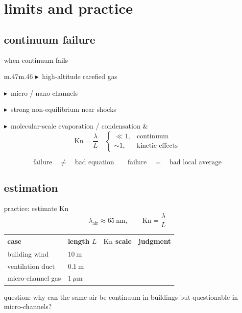 \documentclass[UTF8,9pt]{ctexbeamer}
\newcommand{\Kn}{\mathrm{Kn}}
\newcommand{\olive}[1]{{\color{olive}#1}}
\newcommand{\btri}{\textcolor{blue!75!black}{$\blacktriangleright$}}
\begin{document}
\section{limits and practice}
\subsection{continuum failure}

\begin{frame}[label=failure]{when continuum fails}
\begin{tabular}{m{}m{}}
\small
\btri\ high-altitude rarefied gas

\vspace{.14cm}
\btri\ micro / nano channels

\vspace{.14cm}
\btri\ strong non-equilibrium near shocks

\vspace{.14cm}
\btri\ molecular-scale evaporation / condensation
&
\[
\Kn=\frac{\lambda}{L}
\quad
\begin{cases}
\ll 1, & \text{continuum}\\
\sim 1, & \text{kinetic effects}
\end{cases}
\]
\end{tabular}

\vspace{.23cm}
\[
\text{failure}
\quad \neq \quad
\text{bad equation}
\qquad
\text{failure}
\quad = \quad
\text{bad local average}
\]
\end{frame}

\subsection{estimation}

\begin{frame}[label=practice]{practice: estimate $\Kn$}
\[
\lambda_{\text{air}}\approx 65\ \mathrm{nm},
\qquad
\Kn=\frac{\lambda}{L}
\]

\vspace{.14cm}
\begin{center}
\small
\begin{tabular}{llll}
\toprule
case & length $L$ & $\Kn$ scale & judgment\\
\midrule
building wind & $10\ \mathrm{m}$ & \phantom{$10^{-8}$} & \phantom{continuum}\\
ventilation duct & $0.1\ \mathrm{m}$ & \phantom{$10^{-6}$} & \phantom{continuum}\\
micro-channel gas & $1\ \mu\mathrm{m}$ & \phantom{$10^{-2}$} & \phantom{check slip}\\
\bottomrule
\end{tabular}
\end{center}

\vspace{.2cm}
\olive{\small question: why can the same air be continuum in buildings but questionable in micro-channels?}
\end{frame}
\end{document}
